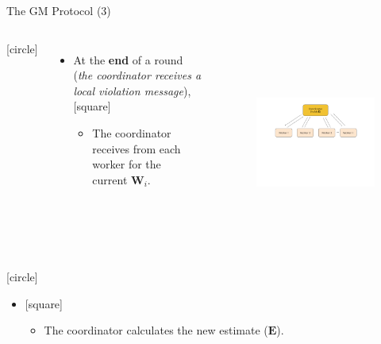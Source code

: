 \begin{frame}{The GM Protocol (3)}
    \begin{columns}
        \vspace{-3cm}
        [circle]
        \begin{itemize}
            \item{At the \textbf{end} of a round\\(\emph{the coordinator receives a local violation message}),
            \vspace{0.2cm}
            [square]
            \begin{itemize}
                \item{The coordinator receives from each worker for the\\current $\pmb{W}_i$.}
            \end{itemize}
            }
        \end{itemize}
        \begin{figure}
            \includegraphics[width=8.5cm,height=6cm,center]{images/ml-fgm-2.png}\label{fig:ml-gm-3}
        \end{figure}
    \end{columns}
    \vspace{-3cm}
    [circle]
    \begin{itemize}
        \item[]{
        [square]
        \begin{itemize}
            \item{The coordinator calculates the new estimate ($\pmb{E}$).}
        \end{itemize}
        }
    \end{itemize}
\end{frame}

